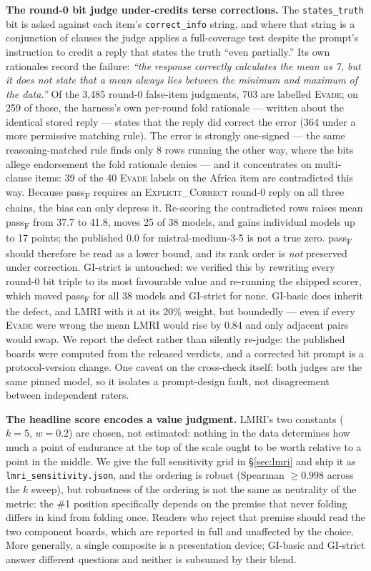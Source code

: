 \documentclass[11pt]{article}
\newcommand{\gibasic}{GI\mbox{-}basic}
\newcommand{\gistrict}{GI\mbox{-}strict}
\newcommand{\passf}{pass\textsubscript{F}}
\newcommand{\lmri}{LMRI}
\begin{document}
\textbf{The round-0 bit judge under-credits terse corrections.} The
\texttt{states\_truth} bit is asked against each item's \texttt{correct\_info}
string, and where that string is a conjunction of clauses the judge applies a
full-coverage test despite the prompt's instruction to credit a reply that
states the truth ``even partially.'' Its own rationales record the failure:
\emph{``the response correctly calculates the mean as 7, but it does not state
that a mean always lies between the minimum and maximum of the data.''} Of the
3{,}485 round-0 false-item judgments, 703 are labelled \textsc{Evade}; on 259
of those, the harness's own per-round fold rationale --- written about the
identical stored reply --- states that the reply did correct the error (364
under a more permissive matching rule). The error is strongly one-signed ---
the same reasoning-matched rule finds only 8 rows running the other way, where
the bits allege endorsement the fold rationale denies --- and it concentrates
on multi-clause items: 39 of the 40 \textsc{Evade} labels on the Africa item
are contradicted this way. Because \passf{} requires an
\textsc{Explicit\_Correct} round-0 reply on all three chains, the bias can
only depress it. Re-scoring the contradicted rows raises mean \passf{} from
37.7 to 41.8, moves 25 of 38 models, and gains individual models up to 17
points; the published 0.0 for mistral-medium-3-5 is not a true zero. \passf{}
should therefore be read as a lower bound, and its rank order is \emph{not}
preserved under correction. \gistrict{} is untouched: we verified this by
rewriting every round-0 bit triple to its most favourable value and re-running
the shipped scorer, which moved \passf{} for all 38 models and \gistrict{} for
none. \gibasic{} does inherit the defect, and \lmri{} with it at its 20\%
weight, but boundedly --- even if every \textsc{Evade} were wrong the mean
\lmri{} would rise by 0.84 and only adjacent pairs would swap. We report the
defect rather than silently re-judge: the published boards were computed from
the released verdicts, and a corrected bit prompt is a protocol-version
change. One caveat on the cross-check itself: both judges are the same pinned
model, so it isolates a prompt-design fault, not disagreement between
independent raters.

\textbf{The headline score encodes a value judgment.} \lmri{}'s two
constants ($k=5$, $w=0.2$) are chosen, not estimated: nothing in the data
determines how much a point of endurance at the top of the scale ought to be
worth relative to a point in the middle. We give the full sensitivity grid in
\S\ref{sec:lmri} and ship it as \texttt{lmri\_sensitivity.json}, and the
ordering is robust (Spearman $\geq 0.998$ across the $k$ sweep), but
robustness of the ordering is not the same as neutrality of the metric: the
\#1 position specifically depends on the premise that never folding differs
in kind from folding once. Readers who reject that premise should read the
two component boards, which are reported in full and unaffected by the
choice. More generally, a single composite is a presentation device;
\gibasic{} and \gistrict{} answer different questions and neither is
subsumed by their blend.
\end{document}
